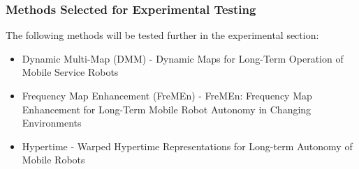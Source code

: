   \subsubsection{ Methods Selected for Experimental Testing }
  The following methods will be tested further in the experimental section:
  \begin{itemize}
    \item Dynamic Multi-Map (DMM) - Dynamic Maps for Long-Term Operation of Mobile Service Robots \cite{biber2005}
    \item Frequency Map Enhancement (FreMEn) - FreMEn: Frequency Map Enhancement for Long-Term Mobile Robot Autonomy in Changing Environments \cite{Krajnik2015}
    \item Hypertime - Warped Hypertime Representations for Long-term Autonomy of Mobile Robots \cite{Kranjik2018}
  \end{itemize}


